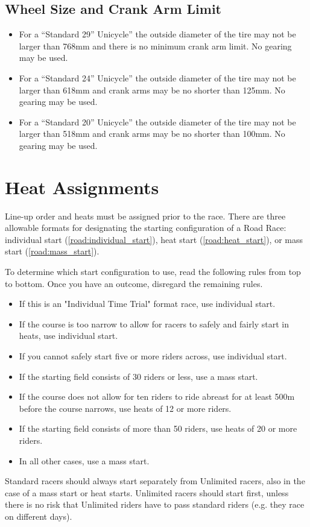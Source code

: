 \subsection{Wheel Size and Crank Arm Limit}
\begin{itemize}
\item For a “Standard 29” Unicycle” the outside diameter of the tire may not be larger than 768mm and there is no minimum crank arm limit. No gearing may be used.
\item For a “Standard 24” Unicycle” the outside diameter of the tire may not be larger than 618mm and crank arms may be no shorter than 125mm. No gearing may be used.
\item For a “Standard 20” Unicycle” the outside diameter of the tire may not be larger than 518mm and crank arms may be no shorter than 100mm. No gearing may be used.
\end{itemize}

\section{Heat Assignments}
Line-up order and heats must be assigned prior to the race. There are three allowable formats for designating the starting configuration of a Road Race: individual start (\ref{road:individual_start}), heat start (\ref{road:heat_start}), or mass start (\ref{road:mass_start}).

To determine which start configuration to use, read the following rules from top to bottom. Once you have an outcome, disregard the remaining rules.
\begin{itemize}
\item If this is an "Individual Time Trial" format race, use individual start. 
\item If the course is too narrow to allow for racers to safely and fairly start in heats, use individual start. 
\item If you cannot safely start five or more riders across, use individual start. 
\item If the starting field consists of 30 riders or less, use a mass start. 
\item If the course does not allow for ten riders to ride abreast for at least 500m before the course narrows, use heats of 12 or more riders. 
\item If the starting field consists of more than 50 riders, use heats of 20 or more riders. 
\item In all other cases, use a mass start.
\end{itemize}
Standard racers should always start separately from Unlimited racers, also in the case of a mass start or heat starts. Unlimited racers should start first, unless there is no risk that Unlimited riders have to pass standard riders (e.g. they race on different days).

